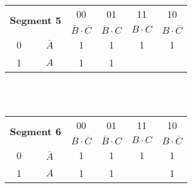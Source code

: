 \documentclass[12pt]{article}
\begin{document}
\begin{center}
	\begin{tabular}{|c|c| |c|c|c|c|}
		\hline
		\multicolumn{2}{|c||}{\multirow{2}{*}{\textbf{Segment 5}}} & 00                                & 01                     & 11          & 10                         \\ \cline{3-6}
		\multicolumn{2}{|c||}{}                           & $\overline{B} \cdot \overline{C}$ & $\overline{B} \cdot C$ & $B \cdot C$ & $B \cdot \overline{C}$     \\  \cline{3-6}  \hline \hline
		0                                                 & $\overline{A}$                    & 1                      & 1           & 1                      & 1 \\ \hline
		1                                                 & $A$                               & 1                      & 1           &                        &   \\ \hline
	\end{tabular} \leavevmode \\\leavevmode\\ [15mm]
	\begin{tabular}{|c|c| |c|c|c|c|}
		\hline
		\multicolumn{2}{|c||}{\multirow{2}{*}{\textbf{Segment 6}}} & 00                                & 01                     & 11          & 10                         \\ \cline{3-6}
		\multicolumn{2}{|c||}{}                           & $\overline{B} \cdot \overline{C}$ & $\overline{B} \cdot C$ & $B \cdot C$ & $B \cdot \overline{C}$     \\  \cline{3-6}  \hline \hline
		0                                                 & $\overline{A}$                    & 1                      & 1           & 1                      & 1 \\ \hline
		1                                                 & $A$                               & 1                      & 1           &                        & 1 \\ \hline
	\end{tabular}
\end{center}
\newpage
\end{document}
